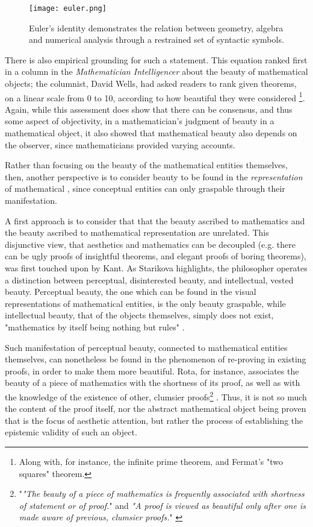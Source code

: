 \begin{figure}
    \texttt{[image: euler.png]}
    \caption{Euler's identity demonstrates the relation between geometry, algebra and numerical analysis through a restrained set of syntactic symbols.}
    \label{graphic:euler}
\end{figure}

There is also empirical grounding for such a statement. This equation ranked first in a column in the \emph{Mathematician Intelligencer} about the beauty of mathematical objects; the columnist, David Wells, had asked readers to rank given theorems, on a linear scale from 0 to 10, according to how beautiful they were considered \citep{wells_are_1990}\footnote{Along with, for instance, the infinite prime theorem, and Fermat's "two squares" theorem.}. Again, while this assessment does show that there can be consensus, and thus some aspect of objectivity, in a mathematician's judgment of beauty in a mathematical object, it also showed that mathematical beauty also depends on the observer, since mathematicians provided varying accounts.

Rather than focusing on the beauty of the mathematical entities themselves, then, another perspective is to consider beauty to be found in the \emph{representation} of mathematical , since conceptual entities can only graspable through their manifestation.

A first approach is to consider that that the beauty ascribed to mathematics and the beauty ascribed to mathematical representation are unrelated. This disjunctive view, that aesthetics and mathematics can be decoupled (e.g. there can be ugly proofs of insightful theorems, and elegant proofs of boring theorems), was first touched upon by Kant. As Starikova highlights, the philosopher operates a distinction between perceptual, disinterested beauty, and intellectual, vested beauty. Perceptual beauty, the one which can be found in the visual representations of mathematical entities, is the only beauty graspable, while intellectual beauty, that of the objects themselves, simply does not exist, "mathematics by itself being nothing but rules" \citep{starikova_aesthetic_2018}.

Such manifestation of perceptual beauty, connected to mathematical entities themselves, can nonetheless be found in the phenomenon of re-proving in existing proofs, in order to make them more beautiful. Rota, for instance, associates the beauty of a piece of mathematics with the shortness of its proof, as well as with the knowledge of the existence of other, clumsier proofs\footnote{"\emph{"The beauty of a piece of mathematics is frequently associated with shortness of statement or of proof.}" and \emph{"A proof is viewed as beautiful only after one is made aware of previous, clumsier proofs.}" \citep{rota_phenomenology_1997}} \citep{rota_phenomenology_1997}. Thus, it is not so much the content of the proof itself, nor the abstract mathematical object being proven that is the focus of aesthetic attention, but rather the process of establishing the epistemic validity of such an object.

